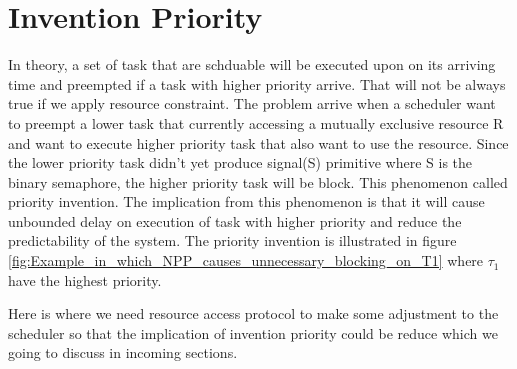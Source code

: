 \section{Invention Priority}

In theory, a set of task that are schduable will be executed upon on its arriving time and preempted if a task with higher priority arrive. That will not be always true if we apply resource constraint. The problem arrive when  a scheduler want to preempt a lower task that currently accessing a mutually exclusive resource R and want to execute higher priority task that also want to use the resource. Since the lower priority task didn't yet produce signal(S) primitive where S is the binary semaphore, the higher priority task will be block. This phenomenon called priority invention. The implication from this phenomenon is that it will cause unbounded delay on execution of task with higher priority and reduce the predictability of the system. The priority invention is illustrated in figure \ref{fig:Example_in_which_NPP_causes_unnecessary_blocking_on_T1} where $ \tau_{1} $ have the highest priority.

Here is where we need resource access protocol to make some adjustment to the scheduler so that the implication of invention priority could be reduce which we going to discuss in incoming sections.